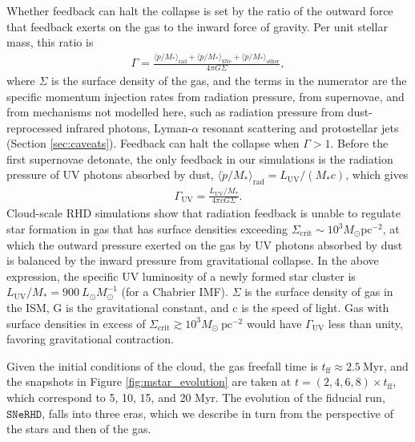\documentclass[twocolumn,linenumbers]{aastex631}
\newcommand{\fidsim}{\mathtt{SNeRHD}}
\begin{document}
Whether feedback can halt the collapse is set by the ratio of the outward force that feedback exerts on the gas to the inward force of gravity. Per unit stellar mass, this ratio is
\begin{align}\label{eq:Gamma}
    \Gamma = \frac{\langle \dot{p}/M_*\rangle_\mathrm{rad} + \langle \dot{p}/M_*\rangle_\mathrm{SNe} + \langle \dot{p}/M_*\rangle_\mathrm{other}}{4\pi G\Sigma},
\end{align}
where $\Sigma$ is the surface density of the gas, and the terms in the numerator are the specific momentum injection rates from radiation pressure, from supernovae, and from mechanisms not modelled here, such as radiation pressure from dust-reprocessed infrared photons, Lyman-$\alpha$ resonant scattering and protostellar jets (Section \ref{sec:caveats}). Feedback can halt the collapse when $\Gamma > 1$. Before the first supernovae detonate, the only feedback in our simulations is the radiation pressure of UV photons absorbed by dust, $\langle \dot{p}/M_*\rangle_\mathrm{rad} = L_\mathrm{UV}/(M_* c)$, which gives
\begin{align}\label{eq2:Guv}
    \Gamma_\mathrm{UV} = \frac{L_\mathrm{UV}/M_* }{4\pi c G\Sigma}.
\end{align}
Cloud-scale RHD simulations \citep{2024ApJ...967L..28M} show that radiation feedback is unable to regulate star formation in gas that has surface densities exceeding $\Sigma_\mathrm{crit} \sim 10^3 M_\odot \mathrm{pc^{-2}}$, at which the outward pressure exerted on the gas by UV photons absorbed by dust is balanced by the inward pressure from gravitational collapse.
In the above expression, the specific UV luminosity of a newly formed star cluster is $L_\mathrm{UV}/M_* = 900\ L_\odot M_\odot^{-1}$ (for a \citealt{2003PASP..115..763C} Chabrier IMF). $\Sigma$ is the surface density of gas in the ISM, G is the gravitational constant, and c is the speed of light. Gas with surface densities in excess of $\Sigma_\mathrm{crit} \gtrsim 10^3 M_\odot\ \mathrm{pc^{-2}}$ would have $\Gamma_\mathrm{UV}$ less than unity, favoring gravitational contraction. 

Given the initial conditions of the cloud, the gas freefall time is $t_\mathrm{ff} \approx 2.5\ \mathrm{Myr}$, and the snapshots in Figure \ref{fig:mstar_evolution} are taken at $t = (2,4,6,8) \times t_\mathrm{ff}$, which correspond to 5, 10, 15, and 20 Myr. The evolution of the fiducial run, $\fidsim$, falls into three eras, which we describe in turn from the perspective of the stars and then of the gas.
\end{document}
